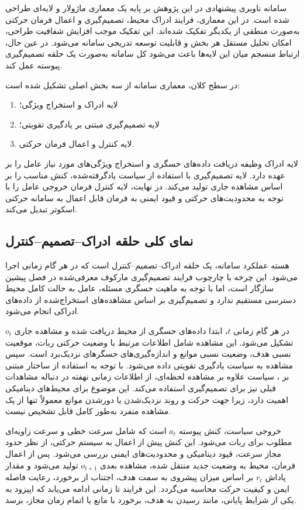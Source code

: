 سامانه ناوبری پیشنهادی در این پژوهش بر پایه یک معماری ماژولار و لایه‌ای طراحی شده است. در این معماری، فرایند ادراک محیط، تصمیم‌گیری و اعمال فرمان حرکتی به‌صورت منطقی از یکدیگر تفکیک شده‌اند. این تفکیک موجب افزایش شفافیت طراحی، امکان تحلیل مستقل هر بخش و قابلیت توسعه تدریجی سامانه می‌شود. در عین حال، ارتباط منسجم میان این لایه‌ها باعث می‌شود کل سامانه به‌صورت یک حلقه تصمیم‌گیری پیوسته عمل کند.

در سطح کلان، معماری سامانه از سه بخش اصلی تشکیل شده است:
\begin{enumerate}
	\item لایه ادراک و استخراج ویژگی؛
	\item لایه تصمیم‌گیری مبتنی بر یادگیری تقویتی؛
	\item لایه کنترل و اعمال فرمان حرکتی.
\end{enumerate}

لایه ادراک وظیفه دریافت داده‌های حسگری و استخراج ویژگی‌های مورد نیاز عامل را بر عهده دارد. لایه تصمیم‌گیری با استفاده از سیاست یادگرفته‌شده، کنش مناسب را بر اساس مشاهده جاری تولید می‌کند. در نهایت، لایه کنترل فرمان خروجی عامل را با توجه به محدودیت‌های حرکتی و قیود ایمنی به فرمان قابل اعمال به سامانه حرکتی اسکوتر تبدیل می‌کند.

\subsection{نمای کلی حلقه ادراک--تصمیم--کنترل}
\label{subsec:perception_decision_control_loop}

هسته عملکرد سامانه، یک حلقه ادراک--تصمیم--کنترل است که در هر گام زمانی اجرا می‌شود. این چرخه با چارچوب فرایند تصمیم‌گیری مارکوف معرفی‌شده در فصل پیشین سازگار است، اما با توجه به ماهیت حسگری مسئله، عامل به حالت کامل محیط دسترسی مستقیم ندارد و تصمیم‌گیری بر اساس مشاهده‌های استخراج‌شده از داده‌های ادراکی انجام می‌شود.

در هر گام زمانی $t$، ابتدا داده‌های حسگری از محیط دریافت شده و مشاهده جاری $o_t$ تشکیل می‌شود. این مشاهده شامل اطلاعات مرتبط با وضعیت حرکتی ربات، موقعیت نسبی هدف، وضعیت نسبی موانع و اندازه‌گیری‌های حسگرهای نزدیک‌برد است. سپس مشاهده به سیاست یادگیری تقویتی داده می‌شود. با توجه به استفاده از ساختار مبتنی بر ، سیاست علاوه بر مشاهده لحظه‌ای، از اطلاعات زمانی نهفته در دنباله مشاهدات قبلی نیز برای تصمیم‌گیری استفاده می‌کند. این موضوع برای محیط‌های دینامیکی اهمیت دارد، زیرا جهت حرکت و روند نزدیک‌شدن یا دورشدن موانع معمولاً تنها از یک مشاهده منفرد به‌طور کامل قابل تشخیص نیست.

خروجی سیاست، کنش پیوسته $a_t$ است که شامل سرعت خطی و سرعت زاویه‌ای مطلوب برای ربات می‌شود. این کنش پیش از اعمال به سیستم حرکتی، از نظر حدود مجاز سرعت، قیود دینامیکی و محدودیت‌های ایمنی بررسی می‌شود. پس از اعمال فرمان، محیط به وضعیت جدید منتقل شده، مشاهده بعدی $o_{t+1}$ تولید می‌شود و مقدار پاداش $r_t$ بر اساس میزان پیشروی به سمت هدف، اجتناب از برخورد، رعایت فاصله ایمن و کیفیت حرکت محاسبه می‌گردد. این فرایند تا زمانی ادامه می‌یابد که اپیزود به یکی از شرایط پایانی، مانند رسیدن به هدف، برخورد با مانع یا اتمام زمان مجاز، برسد.

